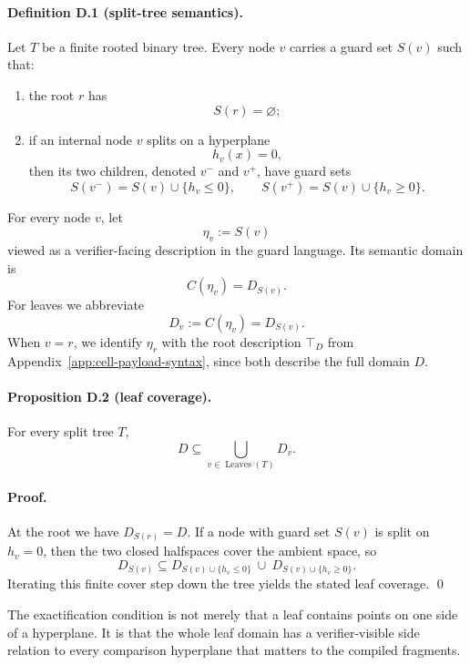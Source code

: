 \paragraph{Definition D.1 (split-tree semantics).}
Let $T$ be a finite rooted binary tree. Every node $v$ carries a guard set $S(v)$ such that:
\begin{enumerate}
    \item the root $r$ has
    \[
    S(r)=\varnothing;
    \]
    \item if an internal node $v$ splits on a hyperplane
    \[
    h_v(x)=0,
    \]
    then its two children, denoted $v^-$ and $v^+$, have guard sets
    \[
    S(v^-)=S(v)\cup\{h_v\le 0\},
    \qquad
    S(v^+)=S(v)\cup\{h_v\ge 0\}.
    \]
\end{enumerate}
For every node $v$, let
\[
 \eta_v:=S(v)
\]
viewed as a verifier-facing description in the guard language. Its semantic domain is
\[
 C(\eta_v)=D_{S(v)}.
\]
For leaves we abbreviate
\[
 D_v:=C(\eta_v)=D_{S(v)}.
\]
When $v=r$, we identify $\eta_r$ with the root description $\top_D$ from Appendix~\ref{app:cell-payload-syntax}, since both describe the full domain $D$.

\paragraph{Proposition D.2 (leaf coverage).}
For every split tree $T$,
\[
 D\subseteq \bigcup_{v\in \operatorname{Leaves}(T)} D_v.
\]

\paragraph{Proof.}
At the root we have $D_{S(r)}=D$. If a node with guard set $S(v)$ is split on $h_v=0$, then the two closed halfspaces cover the ambient space, so
\[
 D_{S(v)}
 \subseteq
 D_{S(v)\cup\{h_v\le 0\}}
 \ \cup\
 D_{S(v)\cup\{h_v\ge 0\}}.
\]
Iterating this finite cover step down the tree yields the stated leaf coverage. \qed

The exactification condition is not merely that a leaf contains points on one side of a hyperplane. It is that the whole leaf domain has a verifier-visible side relation to every comparison hyperplane that matters to the compiled fragments.

